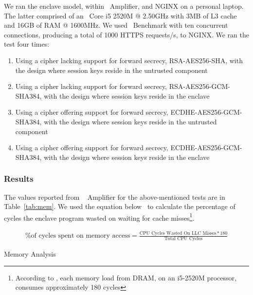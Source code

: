\documentclass[../../../main.tex]{subfiles}
\begin{document}
We ran the enclave model, within \VTune~Amplifier, and NGINX on a
personal laptop. The latter comprised of an \Intel~Core i5 2520M @
2.50GHz with 3MB of L3 cache and 16GB of RAM @ 1600MHz. We used
\Apache~Benchmark with ten concurrent connections, producing a total
of 1000 HTTPS requests/s, to NGINX. We ran the test four times:
\begin{enumerate}
  \item Using a cipher lacking support for forward secrecy,
    RSA-AES256-SHA, with the design where session keys reside in the
    untrusted component
  \item Using a cipher lacking support for forward secrecy,
    RSA-AES256-GCM-SHA384, with the design where session keys reside in the
    enclave
  \item Using a cipher offering support for forward secrecy,
    ECDHE-AES256-GCM-SHA384, with the design where session keys reside in
    the untrusted component
  \item Using a cipher offering support for forward secrecy,
    ECDHE-AES256-GCM-SHA384, with the design where session keys reside in
    the enclave
\end{enumerate}

\subsubsection*{Results}
The values reported from \VTune~ Amplifier for the above-mentioned
tests are in Table~\ref{tab:mem}. We used the equation
below~\cite{intel-eqn} to calculate the percentage of cycles the
enclave program wasted on waiting for cache misses\footnote{According
  to \Intel, each memory load from DRAM, on an i5-2520M processor,
  consumes approximately 180 cycles}.

\begin{align*}
 \text{\% of cycles spent on memory access} = 
    \frac{\text{CPU Cycles Wasted On LLC Misses} * 180}{\text{Total CPU
    Cycles}}
\end{align*}

\begin{table}[H]
  \caption{Memory Analysis}
  \label{tab:mem}
\end{table}
\end{document}
